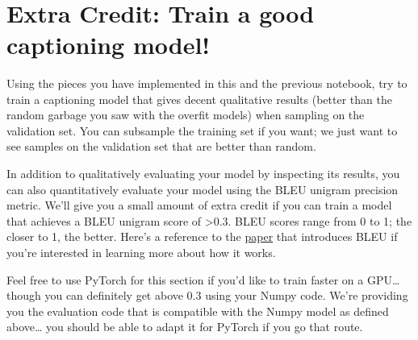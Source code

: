 \documentclass[11pt]{article}
\begin{document}
    \begin{center}
    \end{center}
    { \hspace*{\fill} \\}
    
    \begin{center}
    \end{center}
    { \hspace*{\fill} \\}
    
    \begin{center}
    \end{center}
    { \hspace*{\fill} \\}
    
    \hypertarget{extra-credit-train-a-good-captioning-model}{%
\section{Extra Credit: Train a good captioning
model!}\label{extra-credit-train-a-good-captioning-model}}

Using the pieces you have implemented in this and the previous notebook,
try to train a captioning model that gives decent qualitative results
(better than the random garbage you saw with the overfit models) when
sampling on the validation set. You can subsample the training set if
you want; we just want to see samples on the validation set that are
better than random.

In addition to qualitatively evaluating your model by inspecting its
results, you can also quantitatively evaluate your model using the BLEU
unigram precision metric. We'll give you a small amount of extra credit
if you can train a model that achieves a BLEU unigram score of
\textgreater{}0.3. BLEU scores range from 0 to 1; the closer to 1, the
better. Here's a reference to the
\href{http://www.aclweb.org/anthology/P02-1040.pdf}{paper} that
introduces BLEU if you're interested in learning more about how it
works.

Feel free to use PyTorch for this section if you'd like to train faster
on a GPU\ldots{} though you can definitely get above 0.3 using your
Numpy code. We're providing you the evaluation code that is compatible
with the Numpy model as defined above\ldots{} you should be able to
adapt it for PyTorch if you go that route.
\end{document}
